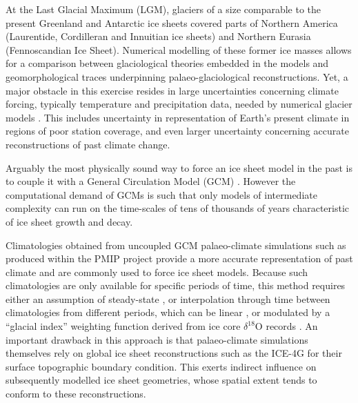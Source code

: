 \introduction
\label{sec:intro}

At the Last Glacial Maximum (LGM), glaciers of a size comparable to the present Greenland and Antarctic ice sheets covered parts of Northern America (Laurentide, Cordilleran and Innuitian ice sheets) and Northern Eurasia (Fennoscandian Ice Sheet). Numerical modelling of these former ice masses allows for a comparison between glaciological theories embedded in the models and geomorphological traces underpinning palaeo-glaciological reconstructions. Yet, a major obstacle in this exercise resides in large uncertainties concerning climate forcing, typically temperature and precipitation data, needed by numerical glacier models \citep{hebeler-etal-2008}. This includes uncertainty in representation of Earth's present climate in regions of poor station coverage, and even larger uncertainty concerning accurate reconstructions of past climate change.

Arguably the most physically sound way to force an ice sheet model in the past is to couple it with a General Circulation Model (GCM) \citep{yoshimori-etal-2001,calov-etal-2002,abeouchi-etal-2007,charbit-etal-2013}. However the computational demand of GCMs is such that only models of intermediate complexity can run on the time-scales of tens of thousands of years characteristic of ice sheet growth and decay.

Climatologies obtained from uncoupled GCM palaeo-climate simulations such as produced within the PMIP project \citep{joussaume-taylor-1995} provide a more accurate representation of past climate and are commonly used to force ice sheet models. Because such climatologies are only available for specific periods of time, this method requires either an assumption of steady-state \citep{huybrechts-tsiobbel-1996}, or interpolation through time between climatologies from different periods, which can be linear \citep{charbit-etal-2002}, or modulated by a ``glacial index'' weighting function derived from ice core $\delta^{18}$O records \citep{marshall-clarke-1999,tarasov-peltier-2004,zweck-huybrechts-2005,gregoire-etal-2012}. An important drawback in this approach is that palaeo-climate simulations themselves rely on global ice sheet reconstructions such as the ICE-4G \citep{peltier-1994} for their surface topographic boundary condition. This exerts indirect influence on subsequently modelled ice sheet geometries, whose spatial extent tends to conform to these reconstructions.

